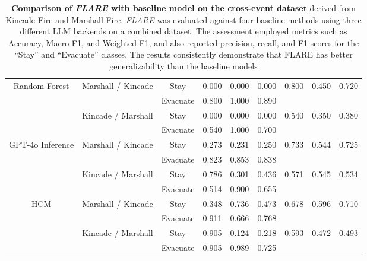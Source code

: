 \begin{table*}[t]
{\begin{tabular}{c|c|c|ccc|ccc}
\midrule
\multirow{4}{*}{Random Forest} 
& \multirow{2}{*}{Marshall / Kincade} 
  & Stay     & 0.000 & 0.000 & 0.000 & \multirow{2}{*}{0.800} & \multirow{2}{*}{0.450} & \multirow{2}{*}{0.720} \\
&           & Evacuate & 0.800 & 1.000 & 0.890 &                     &                     &                     \\ 
\cmidrule{2-9}
& \multirow{2}{*}{Kincade / Marshall} 
  & Stay     & 0.000 & 0.000 & 0.000 & \multirow{2}{*}{0.540} & \multirow{2}{*}{0.350} & \multirow{2}{*}{0.380} \\
&           & Evacuate & 0.540 & 1.000 & 0.700 &                     &                     &                     \\ 
\midrule
\multirow{4}{*}{GPT-4o Inference} 
& \multirow{2}{*}{Marshall / Kincade} 
  & Stay     & 0.273 & 0.231 & 0.250 & \multirow{2}{*}{0.733} & \multirow{2}{*}{0.544}& \multirow{2}{*}{0.725} \\
&           & Evacuate & 0.823 & 0.853 & 0.838 &                     &                     &                     \\ 
\cmidrule{2-9}
& \multirow{2}{*}{Kincade / Marshall} 
  & Stay     & 0.786 & 0.301 & 0.436 & \multirow{2}{*}{0.571} & \multirow{2}{*}{0.545} & \multirow{2}{*}{0.534} \\
&           & Evacuate & 0.514 & 0.900 & 0.655 &                     &                     &                     \\ 
\midrule
\multirow{4}{*}{HCM} 
& \multirow{2}{*}{Marshall / Kincade} 
  & Stay     & 0.348 & 0.736 & 0.473 & \multirow{2}{*}{0.678} & \multirow{2}{*}{0.596} & \multirow{2}{*}{0.710} \\
&           & Evacuate & 0.911 & 0.666 & 0.768 &                     &                     &                     \\ 
\cmidrule{2-9}
& \multirow{2}{*}{Kincade / Marshall} 
  & Stay     & 0.905 & 0.124 & 0.218 & \multirow{2}{*}{0.593} & \multirow{2}{*}{0.472} & \multirow{2}{*}{0.493} \\
&           & Evacuate & 0.905 & 0.989 & 0.725 &                     &                     &                     \\ 

\bottomrule
\end{tabular}}
\caption{\textbf{Comparison of \emph{FLARE} with baseline model on the cross-event dataset} derived from Kincade Fire and Marshall Fire. \emph{FLARE} was evaluated against four baseline methods using three different LLM backends on a combined dataset. The assessment employed metrics such as Accuracy, Macro F1, and Weighted F1, and also reported precision, recall, and F1 scores for the “Stay” and “Evacuate” classes. The results consistently demonstrate that FLARE has better generalizability than the baseline models}
\label{tab:cross_results}
\vspace{-1em}
\end{table*}

